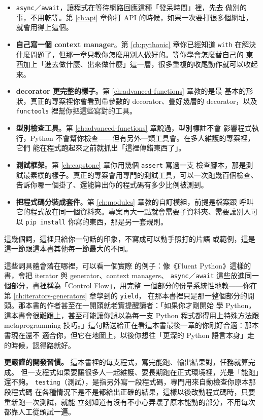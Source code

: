 \begin{itemize}
    \item \texttt{async}／\texttt{await}，讓程式在等待網路回應這種「發呆時間」裡，先去
    做別的事，不用乾等。第 \ref{ch:api} 章你打 API 的時候，如果一次要打很多個網址，
    就會用得上這個。
    \item \textbf{自己寫一個 context manager}。第 \ref{ch:pythonic} 章你已經知道
    \texttt{with} 在解決什麼問題了，但那一章只教你怎麼用別人做好的。等你學會怎麼替自己的
    東西加上「進去做什麼、出來做什麼」這一層，很多重複的收尾動作就可以收起來。
    \item \textbf{decorator 更完整的樣子}。第 \ref{ch:advanced-functions} 章教的是最
    基本的形狀，真正的專案裡你會看到帶參數的 decorator、疊好幾層的 decorator，以及
    \texttt{functools} 裡幫你把這些寫對的工具。
    \item \textbf{型別檢查工具}。第 \ref{ch:advanced-functions} 章說過，型別標註不會
    影響程式執行，Python 不會幫你檢查——但有另外一類工具會。在多人維護的專案裡，它們
    能在程式跑起來之前就抓出「這裡傳錯東西了」。
    \item \textbf{測試框架}。第 \ref{ch:capstone} 章你用幾個 \texttt{assert} 寫過一支
    檢查腳本，那是測試最素樸的樣子。真正的專案會用專門的測試工具，可以一次跑幾百個檢查、
    告訴你哪一個掛了、還能算出你的程式碼有多少比例被測到。
    \item \textbf{把程式碼分裝成套件}。第 \ref{ch:modules} 章教的自訂模組，前提是檔案跟
    呼叫它的程式放在同一個資料夾。專案再大一點就會需要子資料夾、需要讓別人可以
    \texttt{pip install} 你寫的東西，那是另一套規則。
\end{itemize}

這幾個詞，這裡只給你一句話的印象，不寫成可以動手照打的片語
或範例，這是這一節跟這本書其他每一節最大的不同。

這些詞具體會落在哪裡，可以看一個實際
的例子：像《Fluent Python》這樣的書，會把 iterator 與 generator、context managers、
\texttt{async}／\texttt{await} 這些放進同一個部分，書裡稱為「Control Flow」，用完整
一個部分的份量系統性地教——你在第 \ref{ch:iterators-generators} 章學到的 \texttt{yield}，
在那本書裡只是那一整個部分的開頭。那本書的作者甚至在一開頭就老實提醒讀者：「如果你才剛開始
學 Python，這本書會很難跟上，甚至可能讓你誤以為每一支 Python 程式都得用上特殊方法跟
metaprogramming 技巧。」這句話送給正在看這本書最後一章的你剛好合適：那本書現在還不
適合你，但它在地圖上，以後你想往「更深的 Python 語言本身」走的時候，認得路就好。

\textbf{更嚴謹的開發習慣。} 這本書裡的每支程式，寫完能跑、輸出結果對，任務就算完成。
但一支程式如果要讓很多人一起維護、要長期跑在正式環境裡，光是「能跑」還不夠。
\texttt{testing}（測試），是指另外寫一段程式碼，專門用來自動檢查你原本那段程式碼
在各種情況下是不是都給出正確的結果，這樣以後改動程式碼時，只要重新跑一次測試，就能
立刻知道有沒有不小心弄壞了原本能動的部分，不用每次都靠人工從頭試一遍。

